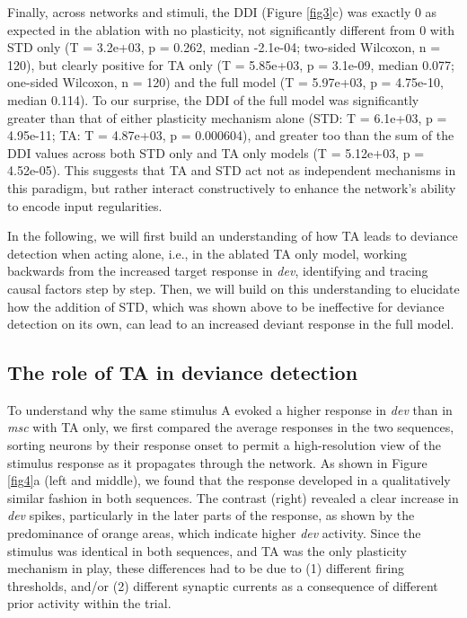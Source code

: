 \documentclass[pdflatex,referee,iicol,sn-basic]{sn-jnl}
\newcommand{\dev}{\textit{dev}}
\newcommand{\msc}{\textit{msc}}
\newcommand{\refpanel}[2]{Figure \ref{fig#1}\lowercase{#2}}
\begin{document}
Finally, across networks and stimuli, the DDI (\refpanel{3}{c}) was exactly 0 as expected in the ablation with no plasticity, not significantly different from 0 with STD only (T = 3.2e+03, p = 0.262, median -2.1e-04; two-sided Wilcoxon, n = 120), but clearly positive for TA only (T = 5.85e+03, p = 3.1e-09, median 0.077; one-sided Wilcoxon, n = 120) and the full model (T = 5.97e+03, p = 4.75e-10, median 0.114). To our surprise, the DDI of the full model was significantly greater than that of either plasticity mechanism alone (STD: T = 6.1e+03, p = 4.95e-11; TA: T = 4.87e+03, p = 0.000604), and greater too than the sum of the DDI values across both STD only and TA only models (T = 5.12e+03, p = 4.52e-05). This suggests that TA and STD act not as independent mechanisms in this paradigm, but rather interact constructively to enhance the network's ability to encode input regularities.

In the following, we will first build an understanding of how TA leads to deviance detection when acting alone, i.e., in the ablated TA only model, working backwards from the increased target response in \dev{}, identifying and tracing causal factors step by step. Then, we will build on this understanding to elucidate how the addition of STD, which was shown above to be ineffective for deviance detection on its own, can lead to an increased deviant response in the full model.

\subsection{The role of TA in deviance detection}\label{sec-ta}

To understand why the same stimulus A evoked a higher response in \dev{} than in \msc{} with TA only, we first compared the average responses in the two sequences, sorting neurons by their response onset to permit a high-resolution view of the stimulus response as it propagates through the network. As shown in \refpanel{4}{a} (left and middle), we found that the response developed in a qualitatively similar fashion in both sequences. The contrast (right) revealed a clear increase in \dev{} spikes, particularly in the later parts of the response, as shown by the predominance of orange areas, which indicate higher \dev{} activity. Since the stimulus was identical in both sequences, and TA was the only plasticity mechanism in play, these differences had to be due to (1) different firing thresholds, and/or (2) different synaptic currents as a consequence of different prior activity within the trial.
\end{document}
